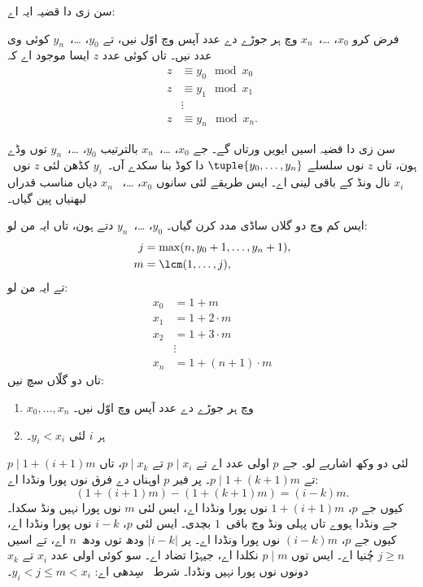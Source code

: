 \documentclass[../../../include/open-logic-section]{subfiles}
\begin{document}
سن زی دا قضیہ ایہ اے:
\begin{thm}
فرض کرو $x_0$، \dots،~$x_n$ وچ ہر جوڑے دے عدد آپس وچ اوّل
نیں، تے $y_0$، \dots،~$y_n$ کوئی وی عدد نیں۔ تاں کوئی
عدد $z$ ایسا موجود اے کہ
\begin{align*}
z & \equiv y_0 \mod x_0 \\
z & \equiv y_1 \mod x_1 \\
& \vdots  \\
z & \equiv y_n \mod x_n.
\end{align*}
\end{thm}

سن زی دا قضیہ اسیں ایویں ورتاں گے۔ جے $x_0$، \dots،~$x_n$
بالترتیب $y_0$، \dots،~$y_n$ توں وڈے ہون، تاں $z$ نوں
سلسلے $\tuple{y_0, \dots,y_n}$ دا کوڈ بنا سکدے آں۔~$y_i$
کڈھن لئی $z$ نوں~$x_i$ نال ونڈ کے باقی لینی اے۔ ایس طریقے
لئی سانوں $x_0$، \dots، ~$x_n$ دیاں مناسب قدراں لبھنیاں پین گیاں۔

ایس کم وچ دو گلاں ساڈی مدد کرن گیاں۔
$y_0$، \dots،~$y_n$ دتے ہون،
تاں ایہ من لو:
\begin{align*}
j &= \max(n, y_0 + 1, \dots, y_n + 1), \\
m &= \lcm(1,\dots,j),
\end{align*}
تے ایہ من لو:
\begin{align*}
x_0 & = 1 + m \\
x_1 & = 1 + 2 \cdot m \\
x_2 & = 1 + 3 \cdot m \\
& \vdots  \\
x_n & = 1 + (n+1) \cdot m
\end{align*}
تاں دو گلّاں سچ نیں:
\begin{enumerate}
\item{} $x_0,\dots,x_n$ وچ ہر جوڑے دے عدد آپس وچ اوّل نیں۔
\item{} ہر $i$ لئی $y_i < x_i$۔
\end{enumerate}
 لئی دو وکھ اشاریے لو۔ جے $p$ اولی عدد اے
تے $p \mid x_i$ تے $p \mid x_k$، تاں
$p \mid 1 + (i+1) m$ تے
$p \mid 1 + (k+1) m$۔
پر فیر $p$ اوہناں دے فرق
نوں پورا ونڈدا اے:
\[
(1 + (i+1)m) - (1+ (k+1)m) = (i-k) m.
\]
کیوں جے $p$، $1 + (i+1)m$ نوں پورا ونڈدا اے، ایس لئی
$m$ نوں پورا نہیں ونڈ سکدا۔ جے ونڈدا ہووے تاں پہلی ونڈ وچ
باقی~$1$ بچدی۔ ایس لئی $p$، $i-k$ نوں پورا ونڈدا اے، کیوں
جے $p$، $(i-k)m$ نوں پورا ونڈدا اے۔ پر $\left|i-k\right|$
ودھ توں ودھ~$n$ اے، تے اسیں $j \geq n$ چُنیا اے۔ ایس توں
$p \mid m$ نکلدا اے، جیہڑا تضاد اے۔ سو کوئی اولی عدد $x_i$
تے $x_k$ دونوں نوں پورا نہیں ونڈدا۔ شرط~ سِدھی اے:
$y_i < j \leq m < x_i$۔
\end{document}
